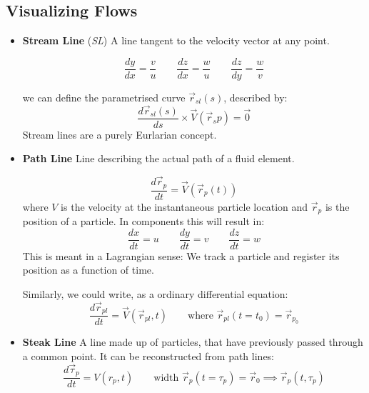\subsection{Visualizing Flows}
\begin{itemize}
	\item \textbf{Stream Line} (\textit{SL}) A line tangent to the velocity vector at any point.

	\begin{figure}[H]
			\centering
			\label{fig:streamlineequationderivation}
	\end{figure}
	
	\begin{equation*}
		\boxed{\frac{dy}{dx} = \frac vu\qquad \frac{dz}{dx} = \frac wu \qquad \frac{dz}{dy} = \frac wv}
	\end{equation*}
	
	we can define the parametrised curve $\vec r_{sl}(s)$, described by:
	\begin{equation*}
		\frac{d\vec r_{sl}(s)}{ds} \times \vec V (\vec r_sp) = \vec 0
	\end{equation*}
	Stream lines are a purely Eurlarian concept.
	
	\item \textbf{Path Line} Line describing the actual path of a fluid element.

	\begin{equation*}
		\frac{d\vec r_p}{dt} = \vec V (\vec r_p(t))
	\end{equation*}
	where $V$ is the velocity at the instantaneous particle location and $\vec r_p$ is the position of a particle. In components this will result in:
	\begin{equation*}
		\boxed{\frac{dx}{dt} = u\qquad \frac{dy}{dt} =v\qquad \frac{dz}{dt} = w}
	\end{equation*}
	This is meant in a Lagrangian sense: We track a particle and register its position as a function of time.
	
	Similarly, we could write, as a ordinary differential equation:
	\begin{equation*}
		\frac{d\vec r_{pl}}{d t} = \vec V(\vec r_{pl},t)\qquad \text{where } \vec r_{pl} (t=t_0) = \vec r_{p_0}
	\end{equation*}
	
	
	\item \textbf{Steak Line} A line made up of particles, that have previously passed through a common point. It can be reconstructed from path lines: 
	\begin{equation*}
		\frac{d \vec \tau_p}{dt} = V(r_p,t)\qquad\text{width }\vec r_p(t=\tau_p) = \vec r_0\implies \vec r_p (t,\tau_p)
	\end{equation*}
\end{itemize}




